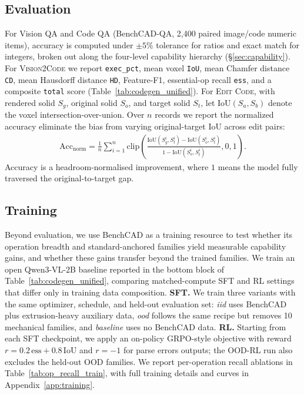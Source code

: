 \subsection{Evaluation}
\label{sec:exp_eval}
For Vision QA and Code QA (BenchCAD-QA, 2{,}400 paired image/code numeric items), accuracy is computed under $\pm 5\%$ tolerance for ratios and exact match for integers, broken out along the four-level capability hierarchy (\S\ref{sec:capability}). For \textsc{Vision2Code} we report \texttt{exec\_pct}, mean voxel \texttt{IoU}, mean Chamfer distance \texttt{CD}, mean Hausdorff distance \texttt{HD}, Feature-F1, essential-op recall \texttt{ess}, and a composite \texttt{total} score (Table~\ref{tab:codegen_unified}). For \textsc{Edit Code}, with rendered solid $S_g$, original solid $S_o$, and target solid $S_t$, let $\mathrm{IoU}(S_a, S_b)$ denote the voxel intersection-over-union. Over $n$ records we report the normalized accuracy eliminate the bias from varying original-target IoU across edit pairs:
\begin{align}
\label{eq:edit_acc}
\mathrm{Acc}_{\mathrm{norm}}
= \frac{1}{n}\sum_{i=1}^{n}
\mathrm{clip}\!\left(
\frac{\mathrm{IoU}(S_g^i, S_t^i) - \mathrm{IoU}(S_o^i, S_t^i)}
{1 - \mathrm{IoU}(S_o^i, S_t^i)}, 0, 1
\right).
\end{align}
Accuracy is a headroom-normalised improvement, where $1$ means the model fully traversed the original-to-target gap. 

\subsection{Training}
\label{sec:exp_training}
Beyond evaluation, we use BenchCAD as a training resource to test whether its operation breadth and standard-anchored families yield measurable capability gains, and whether these gains transfer beyond the trained families. We train an open Qwen3-VL-2B baseline reported in the bottom block of Table~\ref{tab:codegen_unified}, comparing matched-compute SFT and RL settings that differ only in training data composition. 
\textbf{SFT.} We train three variants with the same optimizer, schedule, and held-out evaluation set: \emph{iid} uses BenchCAD plus extrusion-heavy auxiliary data, \emph{ood} follows the same recipe but removes 10 mechanical families, and \emph{baseline} uses no BenchCAD data.
\textbf{RL.} Starting from each SFT checkpoint, we apply an on-policy GRPO-style objective with reward $r{=}0.2\,\mathrm{ess}{+}0.8\,\mathrm{IoU}$ and $r{=}-1$ for parse errors outputs; the OOD-RL run also excludes the held-out OOD families. We report per-operation recall ablations in Table~\ref{tab:op_recall_train}, with full training details and curves in Appendix~\ref{app:training}.

